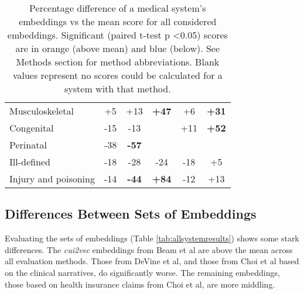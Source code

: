 \documentclass[10pt]{article}
\def\blu#1{{\textbf{\color{blu}#1}}}
\def\ora#1{{\textbf{\color{ora}#1}}}
\begin{document}
\begin{table*}[h]
\begin{center}
\begin{tabular}{l|c|c|c|c|c}
		Musculoskeletal        & +5                         & +13                          & \ora{+47}  & +6                        & \ora{+31} \\
		Congenital           & -15                         & -13                        &                               & +11                        & \ora{+52} \\
		Perinatal            & -38                        & \blu{-57} &                               &                              &                              \\
		Ill-defined          & -18                        & -28                        & -24                        & -18                       & +5                        \\
		Injury and poisoning & -14                        & \blu{-44} & \ora{+84}  & -12                       & +13                       
	\end{tabular}
	\caption{Percentage difference of a medical system's embeddings vs the mean score for all considered embeddings. Significant (paired t-test p \textless 0.05) scores are in orange (above mean) and blue (below). See Methods section for method abbreviations. Blank values represent no scores could be calculated for a system with that method.}
\end{center}
\end{table*}

\subsection{Differences Between Sets of Embeddings}
 Evaluating the sets of embeddings (Table \ref{tab:allsystemresults}) shows some stark differences. The \emph{cui2vec} embeddings from Beam et al are above the mean across all evaluation methods. Those from DeVine et al, and those from Choi et al based on the clinical narratives, do significantly worse. The remaining embeddings, those based on health insurance claims from Choi et al, are more middling. 
\end{document}
